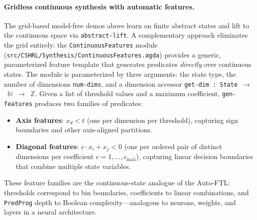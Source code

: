 \documentclass[9pt,a4paper]{article}
\newcommand{\fpath}[1]{\nolinkurl{#1}}
\theoremstyle{plain}
\theoremstyle{definition}
\theoremstyle{remark}
\begin{document}
\paragraph{Gridless continuous synthesis with automatic features.}
\label{sec:gridless-continuous}
The grid-based model-free demos above learn on finite abstract states and lift to the continuous space via \texttt{abstract-lift}.  A complementary approach eliminates the grid entirely: the \texttt{ContinuousFeatures} module (\fpath{src/CSHRL/Synthesis/ContinuousFeatures.agda}) provides a generic, parameterized feature template that generates predicates \emph{directly} over continuous states.  The module is parameterized by three arguments: the state type, the number of dimensions \texttt{num-dims}, and a dimension accessor \texttt{get-dim~:~State~$\to$~$\mathbb{N}$~$\to$~$\mathbb{Z}$}.  Given a list of threshold values and a maximum coefficient, \texttt{gen-features} produces two families of predicates:
\begin{itemize}
\item \textbf{Axis features}: $x_d < t$ (one per dimension per threshold), capturing sign boundaries and other axis-aligned partitions.
\item \textbf{Diagonal features}: $c \cdot x_i + x_j < 0$ (one per ordered pair of distinct dimensions per coefficient $c = 1, \ldots, c_{\max}$), capturing linear decision boundaries that combine multiple state variables.
\end{itemize}
These feature families are the continuous-state analogue of the Auto-FTL: thresholds correspond to bin boundaries, coefficients to linear combinations, and \texttt{PredProg} depth to Boolean complexity---analogous to neurons, weights, and layers in a neural architecture.
\end{document}
